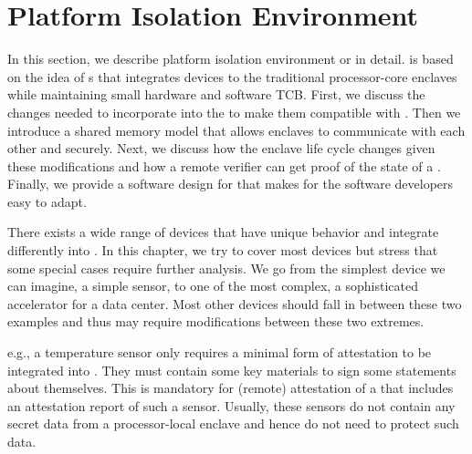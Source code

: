 \section{Platform Isolation Environment}
\label{sec:approach}

In this section, we describe platform isolation environment or \name in detail. \name is based on the idea of \nameenclave{}s that integrates \sphw devices to the traditional processor-core enclaves while maintaining small hardware and software TCB. First, we discuss the changes needed to incorporate into the \sphw to make them compatible with \name. Then we introduce a shared memory model that allows enclaves to communicate with each other and \sphw securely. Next, we discuss how the enclave life cycle changes given these modifications and how a remote verifier can get proof of the state of a \nameenclave{}. Finally, we provide a software design for \name that makes \name for the software developers easy to adapt.



 There exists a wide range of \sphw{} devices that have unique behavior and integrate differently into \name{}.  In this chapter, we try to cover most devices but stress that some special cases require further analysis. We go from the simplest \sphw device we can imagine, a simple sensor, to one of the most complex, a sophisticated accelerator for a data center. Most other \sphw devices should fall in between these two examples and thus may require modifications between these two extremes. 

 e.g., a temperature sensor only requires a minimal form of attestation to be integrated into \name{}. They must contain some key materials to sign some statements about themselves. This is mandatory for (remote) attestation of a \nameenclave that includes an attestation report of such a sensor. Usually, these sensors do not contain any secret data from a processor-local enclave and hence do not need to protect such data.

